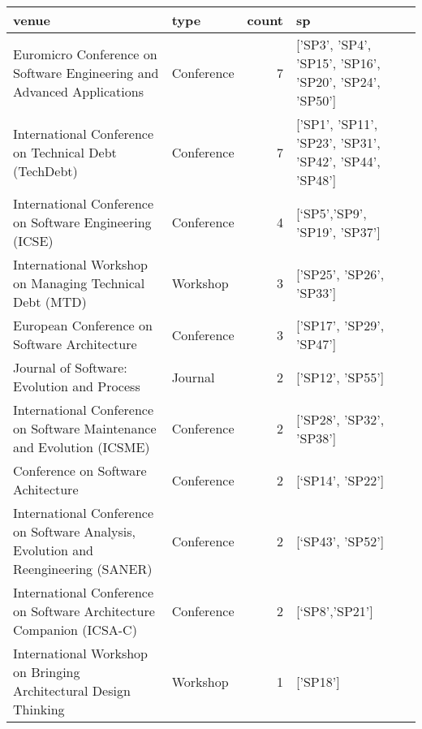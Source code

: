 \begin{tabular}{llrl}
\toprule
                                                                                            venue &        type &  count &                                                       sp \\
\midrule
                           Euromicro Conference on Software Engineering and Advanced Applications &  Conference &      7 &   ['SP3', 'SP4', 'SP15', 'SP16', 'SP20', 'SP24', 'SP50'] \\
                                            International Conference on Technical Debt (TechDebt) &  Conference &      7 &  ['SP1', 'SP11', 'SP23', 'SP31', 'SP42', 'SP44', 'SP48'] \\
                                          International Conference on Software Engineering (ICSE) &  Conference &      4 &                            [‘SP5','SP9', 'SP19', 'SP37'] \\
                                          International Workshop on Managing Technical Debt (MTD) &    Workshop &      3 &                                 ['SP25', 'SP26', 'SP33'] \\
                                                     European Conference on Software Architecture &  Conference &      3 &                                 ['SP17', 'SP29', 'SP47'] \\
                                                       Journal of Software: Evolution and Process &     Journal &      2 &                                         ['SP12', 'SP55'] \\
                           International Conference on Software Maintenance and Evolution (ICSME) &  Conference &      2 &                                 ['SP28', 'SP32', ’SP38’] \\
                                                               Conference on Software Achitecture &  Conference &      2 &                                         [‘SP14’, 'SP22'] \\
               International Conference on Software Analysis, Evolution and Reengineering (SANER) &  Conference &      2 &                                         [‘SP43’, 'SP52'] \\
                             International Conference on Software Architecture Companion (ICSA-C) &  Conference &      2 &                                           [‘SP8','SP21'] \\
                                 International Workshop on Bringing Architectural Design Thinking &    Workshop &      1 &                                                 ['SP18'] \\

\end{tabular}
